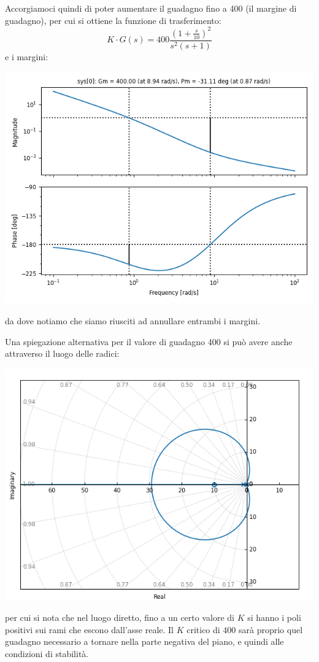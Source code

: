 \documentclass[a4paper,11pt]{article}
\begin{document}
Accorgiamoci quindi di poter aumentare il guadagno fino a 400 (il margine di guadagno), per cui si ottiene la funzione di trasferimento:
$$
K \cdot  G(s) = 400 \frac{\left(1 + \frac{s}{10}\right)^2}{s^2 (s + 1)}
$$
e i margini:
\begin{center}
	\includegraphics[scale=0.75]{../figures/bode_margin_weird.png}
\end{center}
da dove notiamo che siamo riusciti ad annullare entrambi i margini.

Una spiegazione alternativa per il valore di guadagno 400 si può avere anche attraverso il luogo delle radici:
\begin{center}
	\includegraphics[scale=0.8]{../figures/weird_margin_rlocus.png}
\end{center}
per cui si nota che nel luogo diretto, fino a un certo valore di $K$ si hanno i poli positivi sui rami che escono dall'asse reale.
Il $K$ critico di 400 sarà proprio quel guadagno necessario a tornare nella parte negativa del piano, e quindi alle condizioni di stabilità.
\end{document}
